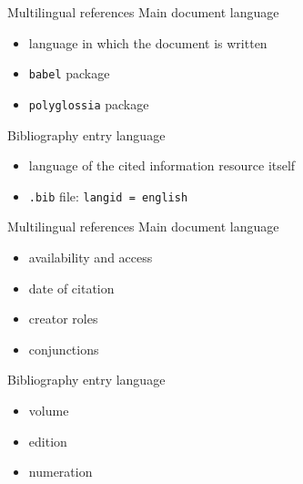 \documentclass{beamer}
\newcommand{\cmd}[1]{\texttt{#1}}
\begin{document}
\begin{frame}{Multilingual references}
Main document language
\begin{itemize}
\item language in which the document is written
\item \texttt{babel} package %
\item \texttt{polyglossia} package
\end{itemize}

Bibliography entry language
\begin{itemize}
\item language of the cited information resource itself
\item \texttt{.bib} file: \cmd{langid = {english}}
\end{itemize}
\end{frame}


\begin{frame}{Multilingual references}
Main document language
\begin{itemize}
\item availability and access %
\item date of citation %
\item creator roles %
\item conjunctions %
\end{itemize}

Bibliography entry language
\begin{itemize}
\item volume %
\item edition %
\item numeration %
\end{itemize}
\end{frame}
\end{document}

